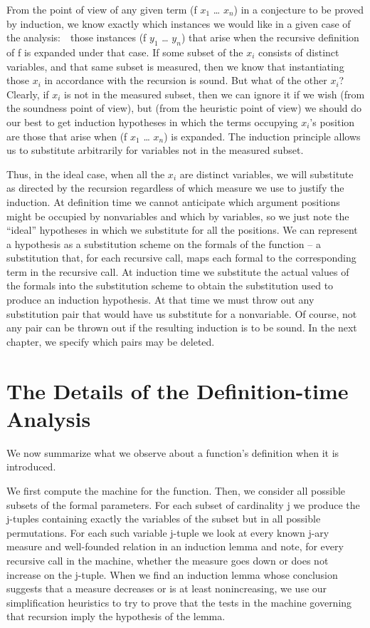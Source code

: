 \documentclass[11pt]{book}
\newcommand{\pubdefaulttextsize}{\large}
\begin{document}
From the point of view of any given term (f $x_{1}$ \ldots{} $x_{n}$)
in a conjecture to be proved by induction, we know exactly which instances
we would like in a given case of the analysis:~~those instances
(f $y_{1}$ \ldots{} $y_{n}$) that arise when the recursive definition of f is expanded
under that case.  If some subset of the $x_{i}$ consists of distinct
variables, and that same subset is measured,
then we know that instantiating those $x_{i}$
in accordance with the recursion is sound.  But what of the other $x_{i}$?
Clearly, if $x_{i}$ is not in the measured subset, then we can ignore it
if we wish (from the soundness point of view), but (from the heuristic
point of view) we should do our
best to get induction hypotheses in which the terms occupying $x_{i}$'s
position are those that arise when (f $x_{1}$ \ldots{} $x_{n}$) is
expanded.
The induction principle allows us to substitute arbitrarily for variables
not in the measured subset.

Thus, in the ideal case, when all the $x_{i}$  are distinct variables, we will
substitute as directed by the recursion regardless of which measure
we use to justify the induction.  At definition time we cannot
anticipate which argument positions might be occupied by nonvariables and which
by variables, so we just note the ``ideal'' hypotheses in which we
substitute for all the positions.  We can represent a hypothesis
as a substitution scheme on the formals of the function -- a substitution
that, for each recursive call, maps each formal to the corresponding term in the
recursive call.  At induction time we substitute
the actual values of the formals into the substitution scheme to obtain
the substitution used to produce an induction hypothesis.
At that time we must throw out any substitution pair that
would have us substitute for a nonvariable.  Of course, not any
pair can be thrown out if the resulting induction is to be sound.  In the next chapter,
we specify which pairs may be deleted.
\section{The Details of the Definition-time Analysis}
\pubdefaulttextsize
We now summarize what we observe about a function's definition
when it is introduced.

We first compute the machine for the function.
Then, we consider all possible subsets of the formal parameters.
For each subset of cardinality j we produce the j-tuples containing exactly the variables of the subset
but in all possible permutations.
For each such variable j-tuple we
look at every known j-ary measure and well-founded relation in
an induction lemma and note, for every recursive call in the machine, whether the measure goes down or does
not increase on the j-tuple.
When we find an induction lemma whose conclusion
suggests that a measure decreases or is at least nonincreasing,
we use our simplification heuristics to try to prove that the tests
in the machine governing that recursion imply the hypothesis of the
lemma.
\end{document}
